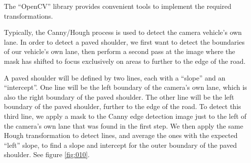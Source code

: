 \documentclass[11pt,twoside]{report}
\begin{document}
The ``OpenCV'' library provides convenient tools to implement the required transformations.

Typically, the Canny/Hough process is used to detect the camera vehicle's own lane.  In order to detect a paved shoulder, we first want to detect the boundaries of our vehicle's own lane, then perform a second pass at the image where the mask has shifted to focus exclusively on areas to further to the edge of the road.

A paved shoulder will be defined by two lines, each with a ``slope'' and an ``intercept''.  One line will be the left boundary of the camera's own lane, which is also the right boundary of the paved shoulder.  The other line will be the left boundary of the paved shoulder, further to the edge of the road.  To detect this third line, we apply a mask to the Canny edge detection image just to the left of the camera's own lane that was found in the first step.  We then apply the same Hough transformation to detect lines, and average the ones with the expected ``left'' slope, to find a slope and intercept for the outer boundary of the paved shoulder.  See figure \ref{fig:010}.
\end{document}
